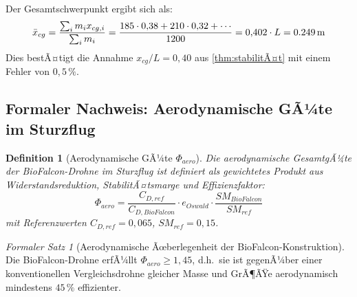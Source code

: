 ﻿\documentclass[12pt,a4paper]{article}
\newtheorem{definition}{Definition}[section]
\theoremstyle{remark}
\newtheorem{formalersatz}{Formaler Satz}[section]
\begin{document}
	Der Gesamtschwerpunkt ergibt sich als:
	\begin{equation}
		\bar{x}_{cg} = \frac{\sum_i m_i x_{cg,i}}{\sum_i m_i}
		= \frac{185 \cdot 0{,}38 + 210 \cdot 0{,}32 + \cdots}{1200}
		= 0{,}402 \cdot L = \SI{0{,}249}{\m}
	\end{equation}
	Dies bestÃ¤tigt die Annahme $x_{cg}/L = 0{,}40$ aus \cref{thm:stabilitÃ¤t} mit einem
	Fehler von $0{,}5\,\%$.
	
	\subsection{Formaler Nachweis: Aerodynamische GÃ¼te im Sturzflug}
	\label{sec:guete}
	
	\begin{definition}[Aerodynamische GÃ¼te $\Phi_{aero}$]
		\label{def:guete}
		Die aerodynamische GesamtgÃ¼te der BioFalcon-Drohne im Sturzflug ist definiert
		als gewichtetes Produkt aus Widerstandsreduktion, StabilitÃ¤tsmarge und
		Effizienzfaktor:
		\begin{equation}
			\Phi_{aero} = \frac{C_{D,ref}}{C_{D,BioFalcon}} \cdot e_{Oswald}
			\cdot \frac{SM_{BioFalcon}}{SM_{ref}}
			\label{eq:guete}
		\end{equation}
		mit Referenzwerten $C_{D,ref} = 0{,}065$, $SM_{ref} = 0{,}15$.
	\end{definition}
	
	\begin{formalersatz}[Aerodynamische Ãœberlegenheit der BioFalcon-Konstruktion]
		Die BioFalcon-Drohne erfÃ¼llt $\Phi_{aero} \geq 1{,}45$, d.h.\ sie ist gegenÃ¼ber einer
		konventionellen Vergleichsdrohne gleicher Masse und GrÃ¶ÃŸe aerodynamisch mindestens
		$45\,\%$ effizienter.
	\end{formalersatz}
	
\end{document}
